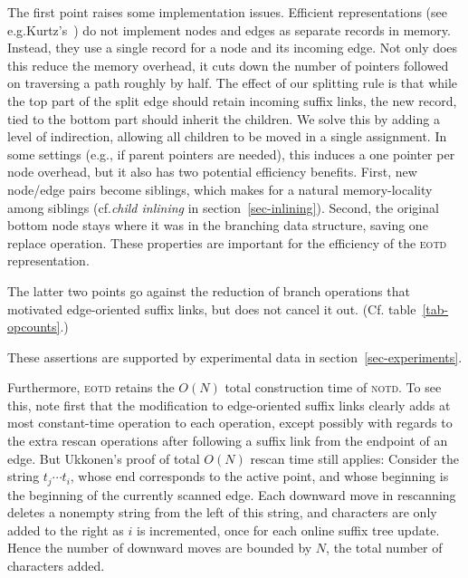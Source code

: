 \documentclass{llncs}
\newcommand\notd{\textsc{notd}\xspace}
\newcommand\eotd{\textsc{eotd}\xspace}
\begin{document}
The first point raises some implementation issues. Efficient representations
(see e.g.\@ Kurtz's~\cite{kurtzsuftree}) do not implement nodes and edges as
separate records in memory. Instead, they use a single record for a node and
its incoming edge. Not only does this reduce the memory overhead, it cuts down
the number of pointers followed on traversing a path roughly by half. The
effect of our splitting rule is that while the top part of the split edge
should retain incoming suffix links, the new record, tied to the bottom part
should inherit the children. We solve this by adding a level of indirection,
allowing all children to be moved in a single assignment. In some settings
(e.g., if parent pointers are needed), this induces a one
pointer per node overhead, but it also has two potential efficiency
benefits. First, new node/edge pairs become siblings, which makes for a natural
memory-locality among siblings (cf.\@ \emph{child inlining} in
section~\ref{sec-inlining}).\label{sec-notechildcache} Second, the original bottom node stays where it was
in the branching data structure, saving one replace operation. These properties
are important for the efficiency of the \eotd representation.

The latter two points go against the reduction of branch operations that
motivated edge-oriented suffix links, but does not cancel it out. (Cf.\@
table~\ref{tab-opcounts}.)

These assertions are supported by experimental data in
section~\ref{sec-experiments}.

Furthermore, \eotd retains the $O(N)$ total construction time of \notd. To see this, note
first that the modification to edge-oriented suffix links clearly adds at most
constant-time operation to each operation, except possibly with regards to the
extra rescan operations after following a suffix link from the endpoint of an
edge. But Ukkonen's proof of total $O(N)$ rescan time still applies: Consider
the string $t_j\cdots t_i$, whose end corresponds to the active point, and
whose beginning is the beginning of the currently scanned edge. Each downward
move in rescanning deletes a nonempty string from the left of this string, and
characters are only added to the right as $i$ is incremented, once for each
online suffix tree update. Hence the number of downward moves are bounded by
$N$, the total number of characters added.


\newcommand\stylescale{.635}
\end{document}
